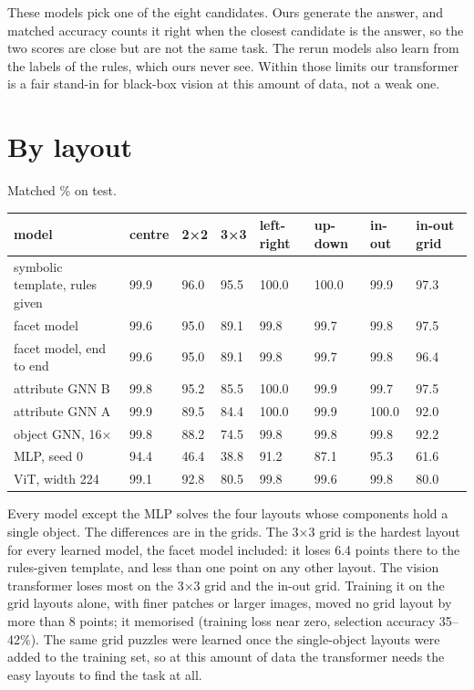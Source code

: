 These models pick one of the eight candidates. Ours generate the answer, and matched accuracy counts it right when the closest candidate is the answer, so the two scores are close but are not the same task. The rerun models also learn from the labels of the rules, which ours never see. Within those limits our transformer is a fair stand-in for black-box vision at this amount of data, not a weak one.

\section{By layout}\label{sec:5.2}

Matched \% on test.

\begin{center}\small
\begin{tabular}{@{}llllllll@{}}
\toprule
model & centre & 2×2 & 3×3 & left-right & up-down & in-out & in-out grid \\
\midrule
symbolic template, rules given & 99.9 & 96.0 & 95.5 & 100.0 & 100.0 & 99.9 & 97.3 \\
facet model & 99.6 & 95.0 & 89.1 & 99.8 & 99.7 & 99.8 & 97.5 \\
facet model, end to end & 99.6 & 95.0 & 89.1 & 99.8 & 99.7 & 99.8 & 96.4 \\
attribute GNN B & 99.8 & 95.2 & 85.5 & 100.0 & 99.9 & 99.7 & 97.5 \\
attribute GNN A & 99.9 & 89.5 & 84.4 & 100.0 & 99.9 & 100.0 & 92.0 \\
object GNN, 16× & 99.8 & 88.2 & 74.5 & 99.8 & 99.8 & 99.8 & 92.2 \\
MLP, seed 0 & 94.4 & 46.4 & 38.8 & 91.2 & 87.1 & 95.3 & 61.6 \\
ViT, width 224 & 99.1 & 92.8 & 80.5 & 99.8 & 99.6 & 99.8 & 80.0 \\
\bottomrule
\end{tabular}
\end{center}

Every model except the MLP solves the four layouts whose components hold a single object. The differences are in the grids. The 3×3 grid is the hardest layout for every learned model, the facet model included: it loses 6.4 points there to the rules-given template, and less than one point on any other layout. The vision transformer loses most on the 3×3 grid and the in-out grid. Training it on the grid layouts alone, with finer patches or larger images, moved no grid layout by more than 8 points; it memorised (training loss near zero, selection accuracy 35–42\%). The same grid puzzles were learned once the single-object layouts were added to the training set, so at this amount of data the transformer needs the easy layouts to find the task at all.

